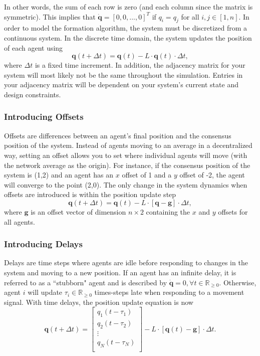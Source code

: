 \documentclass[../CourseManual.tex]{subfiles}
\begin{document}
In other words, the sum of each row is zero (and each column since the matrix is symmetric). This implies that $\boldsymbol{\dot{q}} = [0,0,...,0]^T$ if $q_i = q_j$ for all $i,j \in [1,n]$. In order to model the formation algorithm, the system must be discretized from a continuous system. In the discrete time domain, the system updates the position of each agent using
\[
\boldsymbol{q}(t + \Delta t) = \boldsymbol{q}(t) - L \cdot \boldsymbol{q}(t) \cdot \Delta t,
\]
where $\Delta t$ is a fixed time increment. In addition, the adjacency matrix for your system will most likely not be the same throughout the simulation. Entries in your adjacency matrix will be dependent on your system's current state and design constraints.

\subsubsection{Introducing Offsets} \label{Introducing Offsets}
Offsets are differences between an agent's final position and the consensus position of the system. Instead of agents moving to an average in a decentralized way, setting an offset allows you to set where individual agents will move (with the network average as the origin). For instance, if the consensus position of the system is (1,2) and an agent has an $x$ offset of 1 and a $y$ offset of -2, the agent will converge to the point (2,0). The only change in the system dynamics when offsets are introduced is within the position update step
\[
\boldsymbol{q}(t+\Delta t) = \boldsymbol{q}(t) - L \cdot [\boldsymbol{q} - \boldsymbol{g}] \cdot \Delta t,
\]
where $\boldsymbol{g}$ is an offset vector of dimension $n \times 2$ containing the $x$ and $y$ offsets for all agents.

\subsubsection{Introducing Delays} \label{Introducing Delays}
Delays are time steps where agents are idle before responding to changes in the system and moving to a new position. If an agent has an infinite delay, it is referred to as a ``stubborn" agent and is described by $\boldsymbol{\dot{q}} = 0, \forall t \in \mathbb{R}_{\geq0}$. Otherwise, agent $i$ will update $\tau_i \in \mathbb{R}_{\geq0}$ times-steps late when responding to a movement signal. With time delays, the position update equation is now
\[
\boldsymbol{q}(t+\Delta t) =
\begin{bmatrix}
q_1(t-\tau_1)\\
q_2(t-\tau_2)\\
\vdots \\
q_N(t-\tau_N)\\
\end{bmatrix}
- L \cdot [\boldsymbol{q}(t) - \boldsymbol{g}] \cdot \Delta t.
\]
\end{document}
